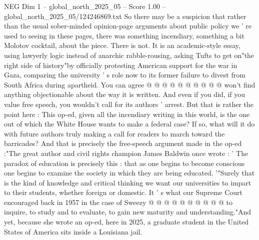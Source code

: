 \begin{textsample}{NEG Dim 1 – global\_north\_2025\_05 – Score 1.00 – global\_north\_2025\_05/124246869.txt}
So there may be a suspicion that rather than the usual sober-minded opinion-page arguments about public policy we ' re used to seeing in these pages, there was something incendiary, something a bit Molotov cocktail, about the piece.
There is not.
It is an academic-style essay, using lawyerly logic instead of anarchic rabble-rousing, asking Tufts to get on"the right side of history"by officially protesting American support for the war in Gaza, comparing the university ' s role now to its former failure to divest from South Africa during apartheid.
You can agree @ @ @ @ @ @ @ @ @ @ won't find anything objectionable about the way it is written.
And even if you did, if you value free speech, you wouldn't call for its authors ' arrest.
But that is rather the point here : This op-ed, given all the incendiary writing in this world, is the one out of which the White House wants to make a federal case?
If so, what will it do with future authors truly making a call for readers to march toward the barricades?
And that is precisely the free-speech argument made in the op-ed :"The great author and civil rights champion James Baldwin once wrote : ' The paradox of education is precisely this : that as one begins to become conscious one begins to examine the society in which they are being educated. '"Surely that is the kind of knowledge and critical thinking we want our universities to impart to their students, whether foreign or domestic.
It ' s what our Supreme Court encouraged back in 1957 in the case of Sweezy @ @ @ @ @ @ @ @ @ @ to inquire, to study and to evaluate, to gain new maturity and understanding."And yet, because she wrote an op-ed, here in 2025, a graduate student in the United States of America sits inside a Louisiana jail.

\end{textsample}
